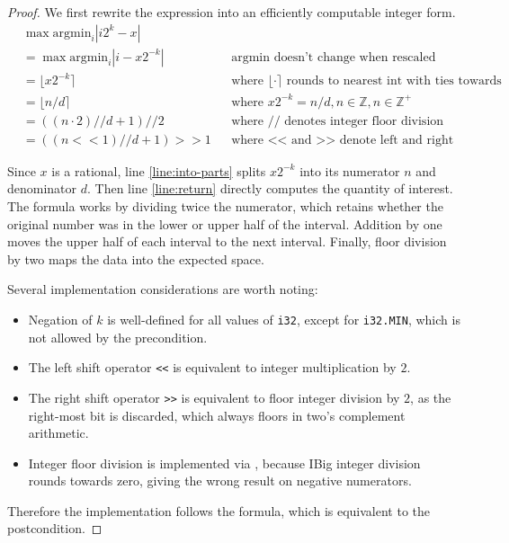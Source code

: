 \documentclass{article}
\begin{document}
\begin{proof}
    We first rewrite the expression into an efficiently computable integer form.
    \begin{align}
        &\max \mathrm{argmin}_i |i 2^k - x| \\
        &= \max \mathrm{argmin}_i |i - x 2^{-k}| &&\text{argmin doesn't change when rescaled}\\
        &= \lfloor x 2^{-k}\rceil &&\text{where } \lfloor \cdot \rceil \text{ rounds to nearest int with ties towards infinity} \\
        &= \lfloor n / d \rceil &&\text{where } x 2^{-k} = n / d, n \in \mathbb{Z}, n \in \mathbb{Z}^+ \\
        &= ((n \cdot 2) // d + 1) // 2 &&\text{where // denotes integer floor division} \\
        &= ((n << 1) // d + 1) >> 1 &&\text{where << and >> denote left and right shift}
    \end{align}

    Since $x$ is a rational, line \ref{line:into-parts} splits $x 2^{-k}$ into its numerator $n$ and denominator $d$.
    Then line \ref{line:return} directly computes the quantity of interest.
    The formula works by dividing twice the numerator, which retains whether the original number was in the lower or upper half of the interval.
    Addition by one moves the upper half of each interval to the next interval.
    Finally, floor division by two maps the data into the expected space.

    Several implementation considerations are worth noting:
    \begin{itemize}
        \item Negation of $k$ is well-defined for all values of \texttt{i32}, 
            except for \texttt{i32.MIN}, which is not allowed by the precondition.
        \item The left shift operator \texttt{<{}<} is equivalent to integer multiplication by $2$.
        \item The right shift operator \texttt{>{}>} is equivalent to floor integer division by $2$,
            as the right-most bit is discarded, which always floors in two's complement arithmetic.
        \item Integer floor division is implemented via ,
            because IBig integer division rounds towards zero, giving the wrong result on negative numerators.
    \end{itemize}

    Therefore the implementation follows the formula, which is equivalent to the postcondition.
\end{proof}
\end{document}
